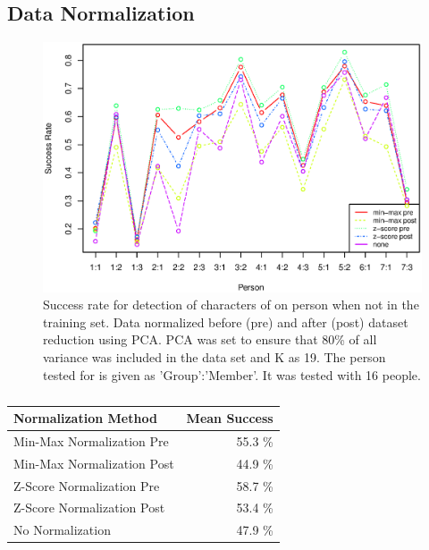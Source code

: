 \subsection{Data Normalization}
\label{sec:DataNormalization}

\begin{figure}[H]
\centering
\includegraphics[width = 16cm]{graphics/graph_normalization_allppl}
\caption{Success rate for detection of characters of on person when not in the training set. 
Data normalized before (pre) and after (post) dataset reduction using PCA.
PCA was set to ensure that 80\% of all variance was included in the data set and K as 19.
The person tested for is given as 'Group':'Member'.
It was tested with 16 people.}
\label{fig:normalization_test_pre-post}
\end{figure}

\begin{table}[H]
\centering
\begin{tabular}{|l|r|}\hline
Normalization Method & Mean Success \\ \hline
Min-Max Normalization Pre & 55.3 \% \\ \hline
Min-Max Normalization Post & 44.9 \% \\ \hline
Z-Score Normalization Pre & 58.7 \% \\ \hline
Z-Score Normalization Post & 53.4  \% \\ \hline
No Normalization & 47.9 \% \\ \hline
\end{tabular}
\caption{}
\label{tab:meanSuccess_normalization_test_pre-post}
\end{table}